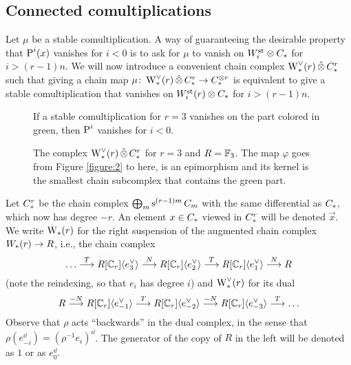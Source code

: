 \subsection{Connected comultiplications}\label{s:connected} Let $\mu$ be a stable comultiplication. A way of guaranteeing the desirable property that $\power^i(x)$ vanishes for $i<0$ is to ask for $\mu$ to vanish on $\Wst[i] \ot  \ucadenas$ for $i>(r-1)n$.
We will now introduce a convenient chain complex $\rWd(r)\hotimes \rucadenas$ such that giving a chain map $\mu \colon  \rWd(r)\hotimes \rucadenas\to \ucadenas^{ \ot  r}$ is equivalent to give a stable comultiplication that vanishes on $\Wst[i](r) \ot  \ucadenas$ for $i>(r-1)n$.
\begin{figure}


\caption{If a stable comultiplication for $r=3$ vanishes on the part colored in green, then $\power^i$ vanishes for $i<0$.}
\label{figure:2}


\caption{The complex $\rWd(r)\hotimes \rucadenas$ for $r=3$ and $R=\bF_3$. The map $\varphi$ goes from Figure \ref{figure:2} to here, is an epimorphism and its kernel is the smallest chain subcomplex that contains the green part.}
\label{figure:3}

\end{figure}
Let $\rucadenas$ be the chain complex $\bigoplus_m \sus{(r-1)m}\ucadenas[m]$ with the same differential as $\ucadenas$, which now has degree $-r$. An element $x\in \ucadenas$ viewed in $\rucadenas$ will be denoted $\vec{x}$. We write $\rW(r)$ for the right suspension of the augmented chain complex $\W(r)\to R$, i.e., the chain complex
\[
\ldots
\overset{T}{\lra}
R[\Cyc_r]\langle e_{3}^\dd\rangle
\overset{N}{\lra}
R[\Cyc_r]\langle e_{2}^\dd\rangle
\overset{T}{\lra}
R[\Cyc_r]\langle e_{1}^\dd\rangle
\overset{N}{\lra}
R
\]
(note the reindexing, so that $e_i$ has degree $i$) and $\rWd(r)$ for its dual
\[
R\overset{-N}{\lra} R[\Cyc_r]\langle e_{-1}^\dd\rangle \overset{T}{\lra} R[\Cyc_r]\langle e_{-2}^\dd\rangle \overset{-N}{\lra} R[\Cyc_r]\langle e_{-3}^\dd\rangle \overset{T}{\lra} \ldots
\]
Observe that $\rho$ acts ``backwards'' in the dual complex, in the sense that $\rho (e_{-i}^\dd) = (\rho^{-1} e_i)^{\dd}$. The generator of the copy of $R$ in the left will be denoted as $1$ or as $e_0^\dd$.

